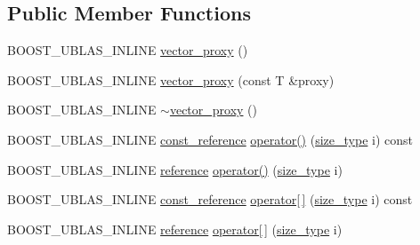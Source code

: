 \subsection*{Public Member Functions}
\begin{DoxyCompactItemize}
\item 
B\+O\+O\+S\+T\+\_\+\+U\+B\+L\+A\+S\+\_\+\+I\+N\+L\+I\+NE \hyperlink{classboost_1_1numeric_1_1ublas_1_1vector__proxy_aeb2d16192730190b3415322a4117daf5}{vector\+\_\+proxy} ()
\item 
B\+O\+O\+S\+T\+\_\+\+U\+B\+L\+A\+S\+\_\+\+I\+N\+L\+I\+NE \hyperlink{classboost_1_1numeric_1_1ublas_1_1vector__proxy_a87a4e164cb0aabffe0a669e2d3402334}{vector\+\_\+proxy} (const T \&proxy)
\item 
B\+O\+O\+S\+T\+\_\+\+U\+B\+L\+A\+S\+\_\+\+I\+N\+L\+I\+NE \hyperlink{classboost_1_1numeric_1_1ublas_1_1vector__proxy_ad89a69572b2cb5b094ef3d49d35286af}{$\sim$vector\+\_\+proxy} ()
\item 
B\+O\+O\+S\+T\+\_\+\+U\+B\+L\+A\+S\+\_\+\+I\+N\+L\+I\+NE \hyperlink{classboost_1_1numeric_1_1ublas_1_1vector__proxy_ae5b208fd787cd64034fae0d362198e76}{const\+\_\+reference} \hyperlink{classboost_1_1numeric_1_1ublas_1_1vector__proxy_ae223ea8592ed602a4b88dbd415d6e7e2}{operator()} (\hyperlink{classboost_1_1numeric_1_1ublas_1_1vector__proxy_a4ea16933b64c4075bcdee2298ab1b11a}{size\+\_\+type} i) const 
\item 
B\+O\+O\+S\+T\+\_\+\+U\+B\+L\+A\+S\+\_\+\+I\+N\+L\+I\+NE \hyperlink{classboost_1_1numeric_1_1ublas_1_1vector__proxy_a71ce5967fa951495f9a201a6b2f17e88}{reference} \hyperlink{classboost_1_1numeric_1_1ublas_1_1vector__proxy_a379938d003ee0f932580fbf9308a6f96}{operator()} (\hyperlink{classboost_1_1numeric_1_1ublas_1_1vector__proxy_a4ea16933b64c4075bcdee2298ab1b11a}{size\+\_\+type} i)
\item 
B\+O\+O\+S\+T\+\_\+\+U\+B\+L\+A\+S\+\_\+\+I\+N\+L\+I\+NE \hyperlink{classboost_1_1numeric_1_1ublas_1_1vector__proxy_ae5b208fd787cd64034fae0d362198e76}{const\+\_\+reference} \hyperlink{classboost_1_1numeric_1_1ublas_1_1vector__proxy_af47140a63c9999608e73acf222267d2e}{operator\mbox{[}$\,$\mbox{]}} (\hyperlink{classboost_1_1numeric_1_1ublas_1_1vector__proxy_a4ea16933b64c4075bcdee2298ab1b11a}{size\+\_\+type} i) const 
\item 
B\+O\+O\+S\+T\+\_\+\+U\+B\+L\+A\+S\+\_\+\+I\+N\+L\+I\+NE \hyperlink{classboost_1_1numeric_1_1ublas_1_1vector__proxy_a71ce5967fa951495f9a201a6b2f17e88}{reference} \hyperlink{classboost_1_1numeric_1_1ublas_1_1vector__proxy_aacfba4abc73d10325c2b0f832ee99259}{operator\mbox{[}$\,$\mbox{]}} (\hyperlink{classboost_1_1numeric_1_1ublas_1_1vector__proxy_a4ea16933b64c4075bcdee2298ab1b11a}{size\+\_\+type} i)
\end{DoxyCompactItemize}


